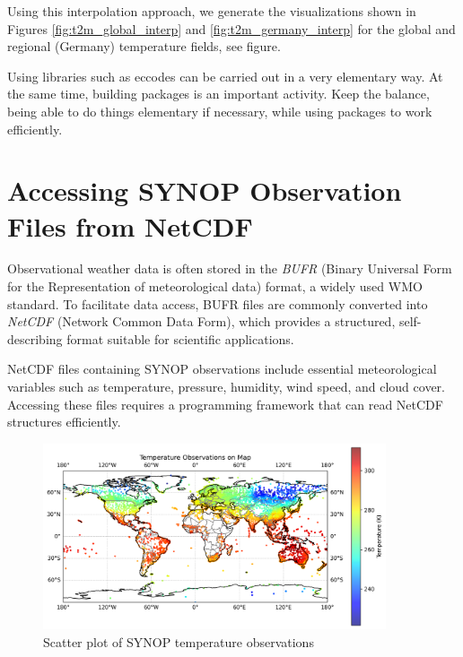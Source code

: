 Using this interpolation approach, we generate the visualizations shown in Figures \ref{fig:t2m_global_interp} and \ref{fig:t2m_germany_interp} for the global and regional (Germany) temperature fields, see figure. 

\begin{recommendationbox}
Using libraries such as eccodes can be carried out in a very elementary way. At the same time, building packages is an important activity. Keep the balance, being able to do things elementary if necessary, while using packages to work efficiently. 
\end{recommendationbox}

%
\section{Accessing SYNOP Observation Files from NetCDF}

Observational weather data is often stored in the \emph{BUFR} (Binary Universal Form for the Representation of meteorological data) format, a widely used WMO standard. To facilitate data access, BUFR files are commonly converted into \emph{NetCDF} (Network Common Data Form), which provides a structured, self-describing format suitable for scientific applications.

NetCDF files containing SYNOP observations include essential meteorological variables such as temperature, pressure, humidity, wind speed, and cloud cover. Accessing these files requires a programming framework that can read NetCDF structures efficiently.

\begin{figure}[ht]
    \centering
    \includegraphics[width=0.9\textwidth]{images/synop.png}
    \caption{Scatter plot of SYNOP temperature observations}
    \label{fig:synop_plot}
\end{figure}

